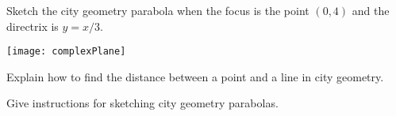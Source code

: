 \documentclass[nooutcomes]{ximera}
\begin{document}
\break

\begin{problem}
Sketch the city geometry parabola when the focus is the point $(0,4)$
and the directrix is $y=x/3$.
\begin{image}
\texttt{[image: complexPlane]}
\end{image}
\end{problem}

\break


\begin{problem}
Explain how to find the distance between a point and a line in city
geometry.
\end{problem}


\begin{problem}
Give instructions for sketching city geometry parabolas.
\end{problem}
\end{document}

